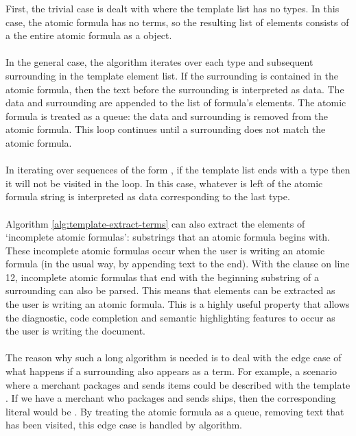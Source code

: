 \documentclass[../main.tex]{subfiles}
\begin{document}
First, the trivial case is dealt with where the template list has no types. In this case, the atomic formula has no terms, so the resulting list of elements consists of a the entire atomic formula as a  object.
\\
\\
In the general case, the algorithm iterates over each type and subsequent surrounding in the template element list. If the surrounding is contained in the atomic formula, then the text before the surrounding is interpreted as data. The data and surrounding are appended to the list of formula's elements. The atomic formula is treated as a queue: the data and surrounding is removed from the atomic formula. This loop continues until a surrounding does not match the atomic formula.
\\
\\
In iterating over sequences of the form , if the template list ends with a type then it will not be visited in the loop. In this case, whatever is left of the atomic formula string is interpreted as data corresponding to the last type.
\\
\\
Algorithm \ref{alg:template-extract-terms} can also extract the elements of `incomplete atomic formulas': substrings that an atomic formula begins with. These incomplete atomic formulas occur when the user is writing an atomic formula (in the usual way, by appending text to the end). With the  clause on line 12, incomplete atomic formulas that end with the beginning substring of a surrounding can also be parsed. This means that elements can be extracted as the user is writing an atomic formula. This is a highly useful property that allows the diagnostic, code completion and semantic highlighting features to occur as the user is writing the document.
\\
\\
The reason why such a long algorithm is needed is to deal with the edge case of what happens if a surrounding also appears as a term. For example, a scenario where a merchant packages and sends items could be described with the template . If we have a merchant who packages and sends ships, then the corresponding literal would be . By treating the atomic formula as a queue, removing text that has been visited, this edge case is handled by algorithm.
\end{document}

